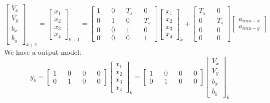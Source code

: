 \documentclass[12pt,a4paper]{article}
\begin{document}
	\begin{equation}
		\boxed{
			\begin{bmatrix}
				V_x \\
				V_y \\
				b_x \\
				b_y 
			\end{bmatrix}_{k+1} =
			\begin{bmatrix}
				x_1 \\
				x_2 \\
				x_3 \\
				x_4 
			\end{bmatrix}_{k+1} = 
			\begin{bmatrix}
				1 &   & 0 &   & T_s &   & 0   \\
				0 &   & 1 &   & 0   &   & T_s \\
				0 &   & 0 &   & 1   &   & 0   \\
				0 &   & 0 &   & 0   &   & 1   
			\end{bmatrix}
			\begin{bmatrix}
				x_1 \\
				x_2 \\
				x_3 \\
				x_4 
			\end{bmatrix}_k +
			\begin{bmatrix}
				T_s &   & 0   \\
				0   &   & T_s \\
				0   &   & 0   \\
				0   &   & 0   
			\end{bmatrix}
			\begin{bmatrix}
				a_{imu-x} \\
				a_{imu-y} 
			\end{bmatrix}
		}
		\label{eq17}
	\end{equation}
	We have a output model:
	\begin{equation}
		\boxed{
			y_k = 
			\begin{bmatrix}
				1 &   & 0 &   & 0 &   & 0 \\
				0 &   & 1 &   & 0 &   & 0 
			\end{bmatrix}
			\begin{bmatrix}
				x_1 \\
				x_2 \\
				x_3 \\
				x_4 
			\end{bmatrix}_k =
			\begin{bmatrix}
				1 &   & 0 &   & 0 &   & 0 \\
				0 &   & 1 &   & 0 &   & 0 
			\end{bmatrix}
			\begin{bmatrix}
				V_x \\
				V_y \\
				b_x \\
				b_y 
			\end{bmatrix}_k
		}
		\label{eq18}
	\end{equation}
\end{document}
